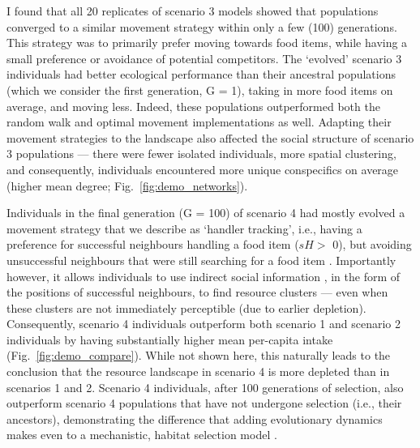 \begin{interludeenv}
I found that all 20 replicates of scenario 3 models showed that populations converged to a similar movement strategy within only a few (100) generations.
This strategy was to primarily prefer moving towards food items, while having a small preference or avoidance of potential competitors.
The `evolved' scenario 3 individuals had better ecological performance than their ancestral populations (which we consider the first generation, G = 1), taking in more food items on average, and moving less.
Indeed, these populations outperformed both the random walk and optimal movement implementations as well.
Adapting their movement strategies to the landscape also affected the social structure of scenario 3 populations --- there were fewer isolated individuals, more spatial clustering, and consequently, individuals encountered more unique conspecifics on average (higher mean degree; Fig.~\ref{fig:demo_networks}).

Individuals in the final generation (G = 100) of scenario 4 had mostly evolved a movement strategy that we describe as `handler tracking', i.e., having a preference for successful neighbours handling a food item ($sH >$ 0), but avoiding unsuccessful neighbours that were still searching for a food item \citep[$sN <$ 0][]{gupte2021a,gupte2022c}.
Importantly however, it allows individuals to use indirect social information \citep{dall2005,spiegel2016a}, in the form of the positions of successful neighbours, to find resource clusters --- even when these clusters are not immediately perceptible (due to earlier depletion).
Consequently, scenario 4 individuals outperform both scenario 1 and scenario 2 individuals by having substantially higher mean per-capita intake (Fig.~\ref{fig:demo_compare}).
While not shown here, this naturally leads to the conclusion that the resource landscape in scenario 4 is more depleted than in scenarios 1 and 2.
Scenario 4 individuals, after 100 generations of selection, also outperform scenario 4 populations that have not undergone selection (i.e., their ancestors), demonstrating the difference that adding evolutionary dynamics makes even to a mechanistic, habitat selection model \citep[such as][]{white2018}.


\end{interludeenv}

